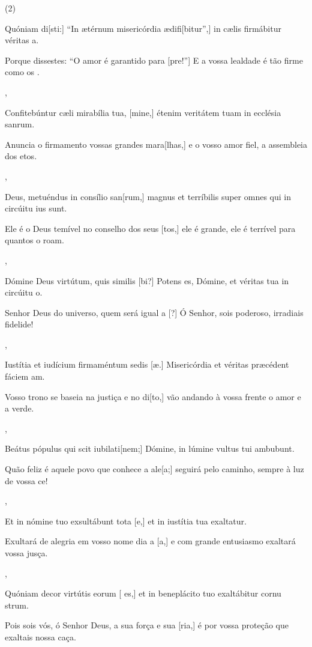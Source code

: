 \SetVersePairs(2){
  {\item {}Quóniam di[sti:] ``In ætérnum misericórdia ædifi[\-bi\-tur'',] in cælis firmábitur véritas a.~\Responsorium}%
    {\item {}Porque dissestes: ``O amor é garantido para [\-pre!''] E a vossa lealdade é tão firme como os .~\Responsorium},
  {\item {}Confitebúntur cæli mirabília tua, [mine,] étenim veritátem tuam in ecclésia san\-rum.~\Responsorium}%
    {\item {}Anuncia o firmamento vossas grandes mara[lhas,] e o vosso amor fiel, a assembleia dos etos.~\Responsorium},
  {\item {}Deus, metuéndus in consílio san[rum,] magnus et terríbilis super omnes qui in circúitu ius sunt.~\Responsorium}%
    {\item {}Ele é o Deus temível no conselho dos seus [tos,] ele é grande, ele é terrível para quantos o roam.~\Responsorium},
  {\item {}Dómine Deus virtútum, quis similis [bi?] Potens es, Dómine, et véritas tua in circúitu o.~\Responsorium}%
    {\item {}Senhor Deus do universo, quem será  igual a [?] Ó Senhor, sois poderoso, irradiais fidelide!~\Responsorium},
  {\item {}Iustítia et iudícium firmaméntum sedis [æ.] Misericórdia et véritas præcédent fáciem am.~\Responsorium}%
    {\item {}Vosso trono se baseia na justiça e no di[to,] vão andando à vossa frente  o amor e a verde.~\Responsorium},
  {\item {}Beátus pópulus qui scit iubilati[nem;] Dó\-mi\-ne, in lúmine vultus tui ambubunt.~\Responsorium}%
    {\item {}Quão feliz é aquele povo que conhece a ale[a;] seguirá pelo caminho, sempre à luz de vossa ce!~\Responsorium},
  {\item {}Et in nómine tuo exsultábunt tota [e,] et in iustítia tua exaltatur.~\Responsorium}%
    {\item {}Exultará de alegria em vosso nome dia a [a,] e com grande entusiasmo exaltará vossa jusça.~\Responsorium},
  {\item {}Quóniam decor virtútis eorum [ es,] et in be\-ne\-plácito tuo exaltábitur cornu strum.~\Responsorium}%
    {\item {}Pois sois vós, ó Senhor Deus, a sua força e sua [ria,] é por vossa proteção que exaltais nossa caça.~\Responsorium}
}